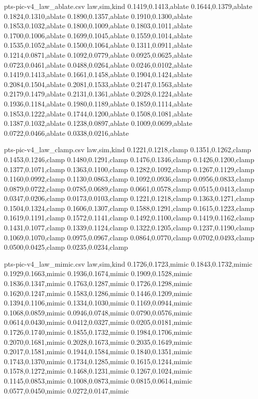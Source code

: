 \begin{filecontents*}[overwrite]{pts-pic-v4_law_ablate.csv}
law,sim,kind
0.1419,0.1413,ablate
0.1644,0.1379,ablate
0.1824,0.1310,ablate
0.1890,0.1357,ablate
0.1910,0.1300,ablate
0.1853,0.1032,ablate
0.1800,0.1009,ablate
0.1803,0.1011,ablate
0.1700,0.1006,ablate
0.1699,0.1045,ablate
0.1559,0.1014,ablate
0.1535,0.1052,ablate
0.1500,0.1064,ablate
0.1311,0.0911,ablate
0.1214,0.0871,ablate
0.1092,0.0779,ablate
0.0925,0.0625,ablate
0.0723,0.0461,ablate
0.0488,0.0264,ablate
0.0246,0.0102,ablate
0.1419,0.1413,ablate
0.1661,0.1458,ablate
0.1904,0.1424,ablate
0.2084,0.1504,ablate
0.2081,0.1533,ablate
0.2147,0.1563,ablate
0.2179,0.1479,ablate
0.2131,0.1361,ablate
0.2028,0.1224,ablate
0.1936,0.1184,ablate
0.1980,0.1189,ablate
0.1859,0.1114,ablate
0.1853,0.1222,ablate
0.1744,0.1200,ablate
0.1508,0.1081,ablate
0.1387,0.1032,ablate
0.1238,0.0897,ablate
0.1009,0.0699,ablate
0.0722,0.0466,ablate
0.0338,0.0216,ablate
\end{filecontents*}
\begin{filecontents*}[overwrite]{pts-pic-v4_law_clamp.csv}
law,sim,kind
0.1221,0.1218,clamp
0.1351,0.1262,clamp
0.1453,0.1246,clamp
0.1480,0.1291,clamp
0.1476,0.1346,clamp
0.1426,0.1200,clamp
0.1377,0.1071,clamp
0.1363,0.1100,clamp
0.1282,0.1092,clamp
0.1267,0.1129,clamp
0.1160,0.0992,clamp
0.1130,0.0863,clamp
0.1092,0.0936,clamp
0.0956,0.0833,clamp
0.0879,0.0722,clamp
0.0785,0.0689,clamp
0.0661,0.0578,clamp
0.0515,0.0413,clamp
0.0347,0.0206,clamp
0.0173,0.0103,clamp
0.1221,0.1218,clamp
0.1363,0.1271,clamp
0.1504,0.1324,clamp
0.1606,0.1307,clamp
0.1588,0.1291,clamp
0.1615,0.1223,clamp
0.1619,0.1191,clamp
0.1572,0.1141,clamp
0.1492,0.1100,clamp
0.1419,0.1162,clamp
0.1431,0.1077,clamp
0.1339,0.1124,clamp
0.1322,0.1205,clamp
0.1237,0.1190,clamp
0.1069,0.1070,clamp
0.0975,0.0967,clamp
0.0864,0.0770,clamp
0.0702,0.0493,clamp
0.0500,0.0425,clamp
0.0235,0.0234,clamp
\end{filecontents*}
\begin{filecontents*}[overwrite]{pts-pic-v4_law_mimic.csv}
law,sim,kind
0.1726,0.1723,mimic
0.1843,0.1732,mimic
0.1929,0.1663,mimic
0.1936,0.1674,mimic
0.1909,0.1528,mimic
0.1836,0.1347,mimic
0.1763,0.1287,mimic
0.1726,0.1298,mimic
0.1620,0.1247,mimic
0.1583,0.1286,mimic
0.1446,0.1209,mimic
0.1394,0.1106,mimic
0.1334,0.1030,mimic
0.1169,0.0944,mimic
0.1068,0.0859,mimic
0.0946,0.0748,mimic
0.0790,0.0576,mimic
0.0614,0.0430,mimic
0.0412,0.0327,mimic
0.0205,0.0181,mimic
0.1726,0.1740,mimic
0.1855,0.1732,mimic
0.1984,0.1706,mimic
0.2070,0.1681,mimic
0.2028,0.1673,mimic
0.2035,0.1649,mimic
0.2017,0.1581,mimic
0.1944,0.1584,mimic
0.1840,0.1351,mimic
0.1743,0.1370,mimic
0.1734,0.1285,mimic
0.1615,0.1244,mimic
0.1578,0.1272,mimic
0.1468,0.1231,mimic
0.1267,0.1024,mimic
0.1145,0.0853,mimic
0.1008,0.0873,mimic
0.0815,0.0614,mimic
0.0577,0.0450,mimic
0.0272,0.0147,mimic
\end{filecontents*}

